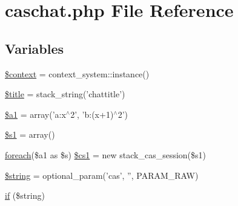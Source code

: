 \hypertarget{caschat_8php}{
\section{caschat.php File Reference}
\label{caschat_8php}
}
\subsection*{Variables}
\begin{DoxyCompactItemize}
\item 
\hyperlink{caschat_8php_ae05dedb802ada0155efdece2044fed64}{\$context} = context\_\-system::instance()
\item 
\hyperlink{caschat_8php_ada57e7bb7c152edad18fe2f166188691}{\$title} = stack\_\-string('chattitle')
\item 
\hyperlink{caschat_8php_abea4e8ac5e11c696186068d74fdc6035}{\$a1} = array('a:x$^\wedge$2', 'b:(x+1)$^\wedge$2')
\item 
\hyperlink{caschat_8php_acd919763fb6f6681741261ca81ac2a55}{\$s1} = array()
\item 
\hyperlink{questiontestrun_8php_afd34bd4e31a3575bb885c2bd1822421e}{foreach}(\$a1 as \$s) \hyperlink{caschat_8php_ac854c221a8efd104a22cb158254655d0}{\$cs1} = new stack\_\-cas\_\-session(\$s1)
\item 
\hyperlink{caschat_8php_a05bc82187ba145848edd864852f4bd37}{\$string} = optional\_\-param('cas', '', PARAM\_\-RAW)
\item 
\hyperlink{caschat_8php_a2018ad56dfaea89ba7f32f4f912be98f}{if} (\$string)
\end{DoxyCompactItemize}



